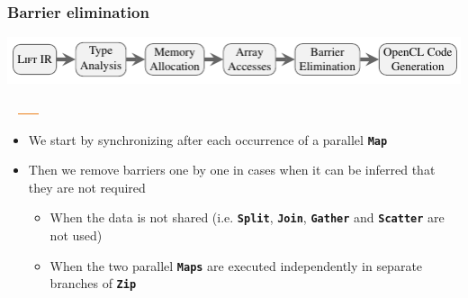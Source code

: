 \documentclass[10pt]{beamer}
\newcommand{\code}[1]{\textbf{\texttt{#1}}}
\begin{document}
\begin{frame}[t]
\frametitle{Barrier elimination}
    \vspace{-1cm}
    \begin{block}{}
        \begin{center}
            \includegraphics[width=1\textwidth]{../images/compilation_stages.pdf}
        \end{center}
        \vspace{-1.05cm}
        \hspace{6.9cm}
        \includegraphics[width=1.25cm, height=0.03cm]{../images/orange_bar.png}
        \vspace{.45cm}
    \end{block}
    \vspace{-0.5cm}
\begin{itemize}
	\item We start by synchronizing after each occurrence of a parallel \code{Map}
	\item Then we remove barriers one by one in cases when it can be inferred that they are not required
	\begin{itemize}
		\item When the data is not shared (i.e. \code{Split}, \code{Join}, \code{Gather} and \code{Scatter} are not used)
		\item When the two parallel \code{Maps} are executed independently in separate branches of \code{Zip}
	\end{itemize}
\end{itemize}
\end{frame}
\end{document}
